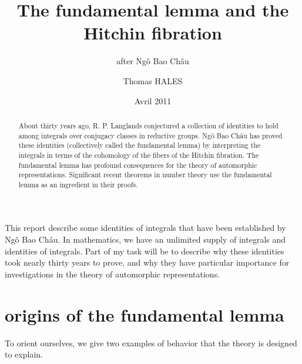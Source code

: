 \documentclass[brochure,english,12pt]{bourbaki}
\date{Avril 2011}
\title{The fundamental lemma and the Hitchin fibration}
\subtitle{after Ng\^o Bao Ch\^au}
\author{Thomas HALES}
\newcommand{\NBC}{Ng\^o Bao Ch\^au}
\begin{document}
\maketitle



{


}

\bigskip



This report describe some identities of integrals that have
been established by \NBC.  In mathematics, we have an unlimited supply
of integrals and identities of integrals.  Part of my task 
will be to describe why these identities took nearly thirty years to
prove, and why they have particular importance for investigations in
the theory of automorphic representations.

\begin{abstract}
About thirty years ago, R. P. Langlands conjectured a collection of
identities to hold among integrals over conjugacy classes in
reductive groups.  Ng\^o Bao Ch\^au has proved these identities
(collectively called the fundamental lemma) by interpreting the
integrals in terms of the cohomology of the fibers of the Hitchin
fibration.  The fundamental lemma has profound consequences for the
theory of automorphic representations. Significant recent theorems in
number theory use the fundamental lemma as an ingredient in their
proofs.
\end{abstract}




\section{origins of the fundamental lemma}


To orient ourselves, we give two examples of
behavior that the theory is designed to explain.
\end{document}
